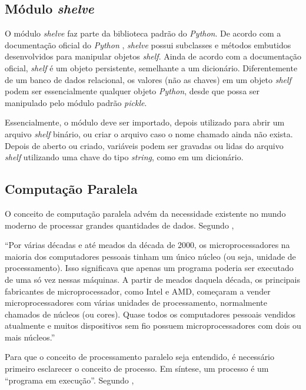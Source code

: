 \documentclass[12pt]{article}
\newcommand{\aspas}[1]{``#1''} %
\newcommand{\citacao}[1]{
	\singlespacing %
	\begin{flushright}
		\begin{minipage}{0.75\linewidth} %
			{\fontsize{10}{\baselineskip}\selectfont \aspas{#1}}
		\end{minipage}
	\end{flushright}
	\onehalfspacing %
}
\begin{document}
\subsection{Módulo \textit{shelve}}
\label{shelve}

O módulo \textit{shelve} faz parte da biblioteca padrão do \textit{Python}. De acordo com a documentação oficial do \textit{Python} \cite{python:2022}, \textit{shelve} possui subclasses e métodos embutidos desenvolvidos para manipular objetos \textit{shelf}. Ainda de acordo com a documentação oficial, \textit{shelf} é um objeto persistente, semelhante a um dicionário. Diferentemente de um banco de dados relacional, os valores (não as chaves) em um objeto \textit{shelf} podem ser essencialmente qualquer objeto \textit{Python}, desde que possa ser manipulado pelo módulo padrão \textit{pickle}.

Essencialmente, o módulo deve ser importado, depois utilizado para abrir um arquivo \textit{shelf} binário, ou criar o arquivo caso o nome chamado ainda não exista. Depois de aberto ou criado, variáveis podem ser gravadas ou lidas do arquivo \textit{shelf} utilizando uma chave do tipo \textit{string}, como em um dicionário.

\subsection{Computação Paralela}
\label{computacao_paralela}

O conceito de computação paralela advém da necessidade existente no mundo moderno de processar grandes quantidades de dados. Segundo \cite{perkovic:2016}, 

\citacao{Por várias décadas e até meados da década de 2000, os microprocessadores na maioria dos computadores pessoais tinham
	um único núcleo (ou seja, unidade de processamento). Isso significava que apenas um programa poderia ser executado de
	uma só vez nessas máquinas. A partir de meados daquela década, os principais fabricantes de microprocessador, como Intel
	e AMD, começaram a vender microprocessadores com várias unidades de processamento, normalmente chamados
	de núcleos (ou cores). Quase todos os computadores pessoais vendidos atualmente e muitos dispositivos sem fio possuem
	microprocessadores com dois ou mais núcleos.}

Para que o conceito de processamento paralelo seja entendido, é necessário primeiro esclarecer o conceito de processo. Em síntese, um processo é um \aspas{programa em execução}. Segundo \cite{perkovic:2016},
\end{document}
